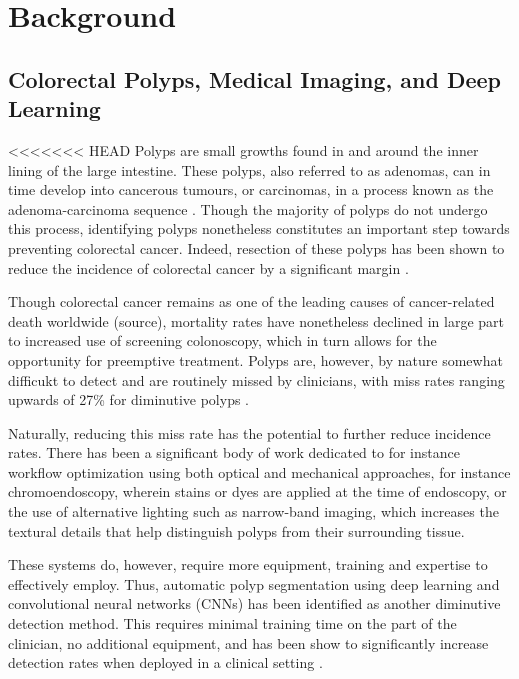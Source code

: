 \chapter{Background}
\setcounter{chapter}{2}


\section{Colorectal Polyps, Medical Imaging, and Deep Learning}
<<<<<<< HEAD
	Polyps are small growths found in and around the inner lining of the large intestine. These polyps, also referred to as adenomas, can in time develop into cancerous tumours, or carcinomas, in a process known as the adenoma-carcinoma sequence \cite{ACS}. Though the majority of polyps do not undergo this process, identifying polyps nonetheless constitutes an important step towards preventing colorectal cancer. Indeed, resection of these polyps has been shown to reduce the incidence of colorectal cancer by a significant margin \cite{resection}. 
	
	Though colorectal cancer remains as one of the leading causes of cancer-related death worldwide (source), mortality rates have nonetheless declined in large part to increased use of screening colonoscopy, which in turn allows for the opportunity for preemptive treatment. Polyps are, however, by nature somewhat difficukt to detect and are routinely missed by clinicians, with miss rates ranging upwards of 27\% for diminutive  polyps \cite{missrate1, missrate2}.
	
	Naturally, reducing this miss rate has the potential to further reduce incidence rates. There has been a significant body of work dedicated to for instance workflow optimization using both optical and mechanical approaches, for instance chromoendoscopy, wherein stains or dyes are applied at the time of endoscopy, or the use of alternative lighting such as narrow-band imaging, which increases the textural details that help distinguish polyps from their surrounding tissue. 
	
	These systems do, however, require more equipment, training and expertise to effectively employ. Thus, automatic polyp segmentation using deep learning and convolutional neural networks (CNNs) has been identified as another diminutive detection method. This requires minimal training time on the part of the clinician, no additional equipment, and has been show to significantly increase detection rates when deployed in a clinical setting \cite{polyp-success-story}. 
	
